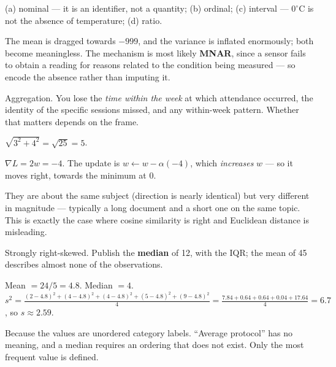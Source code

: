 \begin{ans}
  \item (a) nominal --- it is an identifier, not a quantity; (b) ordinal;
        (c) interval --- $0^\circ$C is not the absence of temperature;
        (d) ratio.
  \item The mean is dragged towards $-999$, and the variance is inflated
        enormously; both become meaningless. The mechanism is most likely
        \textbf{MNAR}, since a sensor fails to obtain a reading for reasons related
        to the condition being measured --- so encode the absence rather than
        imputing it.
  \item Aggregation. You lose the \emph{time within the week} at which attendance
        occurred, the identity of the specific sessions missed, and any
        within-week pattern. Whether that matters depends on the frame.
\end{ans}

\begin{ans}
  \item $\sqrt{3^2+4^2}=\sqrt{25}=5$.
  \item $\nabla L = 2w = -4$. The update is $w \leftarrow w - \alpha(-4)$, which
        \emph{increases} $w$ --- so it moves right, towards the minimum at 0.
  \item They are about the same subject (direction is nearly identical) but very
        different in magnitude --- typically a long document and a short one on the
        same topic. This is exactly the case where cosine similarity is right and
        Euclidean distance is misleading.
\end{ans}

\begin{ans}
  \item Strongly right-skewed. Publish the \textbf{median} of 12, with the IQR;
        the mean of 45 describes almost none of the observations.
  \item Mean $= 24/5 = 4.8$. Median $= 4$.
        $s^2 = \frac{(2-4.8)^2+(4-4.8)^2+(4-4.8)^2+(5-4.8)^2+(9-4.8)^2}{4}
             = \frac{7.84+0.64+0.64+0.04+17.64}{4} = 6.7$, so $s \approx 2.59$.
  \item Because the values are unordered category labels. ``Average protocol'' has
        no meaning, and a median requires an ordering that does not exist. Only the
        most frequent value is defined.
\end{ans}


